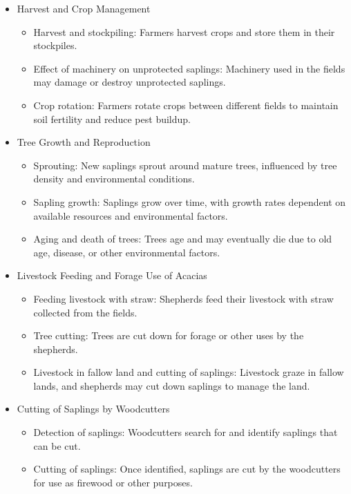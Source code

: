 \documentclass{article}
\begin{document}
        \begin{itemize}
            \item Harvest and Crop Management
            \begin{itemize}
                \item Harvest and stockpiling: Farmers harvest crops and store them in their stockpiles.
                \item Effect of machinery on unprotected saplings: Machinery used in the fields may damage or destroy unprotected saplings.
                \item Crop rotation: Farmers rotate crops between different fields to maintain soil fertility and reduce pest buildup.
            \end{itemize}

            \item Tree Growth and Reproduction
            \begin{itemize}
                \item Sprouting: New saplings sprout around mature trees, influenced by tree density and environmental conditions.
                \item Sapling growth: Saplings grow over time, with growth rates dependent on available resources and environmental factors.
                \item Aging and death of trees: Trees age and may eventually die due to old age, disease, or other environmental factors.
            \end{itemize}

            \item Livestock Feeding and Forage Use of Acacias
            \begin{itemize}
                \item Feeding livestock with straw: Shepherds feed their livestock with straw collected from the fields.
                \item Tree cutting: Trees are cut down for forage or other uses by the shepherds.
                \item Livestock in fallow land and cutting of saplings: Livestock graze in fallow lands, and shepherds may cut down saplings to manage the land.
            \end{itemize}

            \item Cutting of Saplings by Woodcutters
            \begin{itemize}
                \item Detection of saplings: Woodcutters search for and identify saplings that can be cut.
                \item Cutting of saplings: Once identified, saplings are cut by the woodcutters for use as firewood or other purposes.
            \end{itemize}


\end{itemize}
\end{document}
